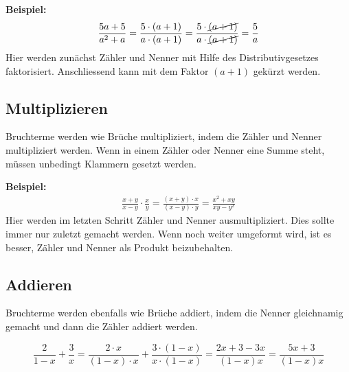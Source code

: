 \begin{example}
  \textbf{Beispiel:}
  \begin{align*}
    \frac{5a+5}{a^{2}+a} = \frac{5\cdot (a+1)}{a\cdot (a+1)} = \frac{5\cdot \cancel{(a+1)}}{a\cdot \cancel{(a+1)}} = \frac{5}{a}
  \end{align*}
  Hier werden zunächst Zähler und Nenner mit Hilfe des Distributivgesetzes faktorisiert. Anschliessend kann mit dem Faktor $(a+1)$ gekürzt werden.
\end{example}

\subsection{Multiplizieren}
Bruchterme werden wie Brüche multipliziert, indem die Zähler und Nenner multipliziert werden. Wenn in einem Zähler oder Nenner eine Summe steht, müssen unbedingt Klammern gesetzt werden.
\begin{example}
  \textbf{Beispiel:}
  \begin{align*}
    \frac{x+y}{x-y}\cdot \frac{x}{y} = \frac{(x+y)\cdot x}{(x-y)\cdot y} = \frac{x^{2}+xy}{xy-y^{2}}
  \end{align*}
  Hier werden im letzten Schritt Zähler und Nenner ausmultipliziert. Dies sollte immer nur zuletzt gemacht werden. Wenn noch weiter umgeformt wird, ist es besser, Zähler und Nenner als Produkt beizubehalten.
\end{example}

\subsection{Addieren}
Bruchterme werden ebenfalls wie Brüche addiert, indem die Nenner gleichnamig gemacht und dann die Zähler addiert werden.
\begin{example}
  \[
    \frac{2}{1-x}+ \frac{3}{x} = \frac{2\cdot x}{(1-x)\cdot x}+\frac{3\cdot (1-x)}{x\cdot (1-x)} = \frac{2x+3-3x}{(1-x)x} = \frac{5x+3}{(1-x)x}
  \]
\end{example}
